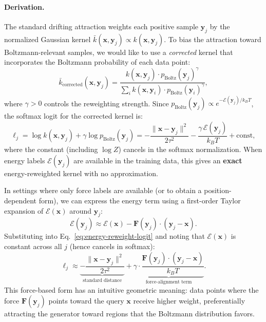 \documentclass[11pt]{article}
\newcommand{\bx}{\mathbf{x}}
\newcommand{\by}{\mathbf{y}}
\newcommand{\bF}{\mathbf{F}}
\newcommand{\kbar}{\bar{k}}
\newcommand{\pboltz}{p_{\text{Boltz}}}
\newcommand{\kBT}{k_BT}
\begin{document}
\paragraph{Derivation.}
The standard drifting attraction weights each positive sample $\by_j$ by the normalized Gaussian kernel $\kbar(\bx, \by_j) \propto k(\bx, \by_j)$.
To bias the attraction toward Boltzmann-relevant samples, we would like to use a \emph{corrected} kernel that incorporates the Boltzmann probability of each data point:
\begin{equation}
    \kbar_{\text{corrected}}(\bx, \by_j) = \frac{k(\bx,\by_j) \cdot \pboltz(\by_j)^\gamma}{\sum_i k(\bx,\by_i) \cdot \pboltz(\by_i)^\gamma},
    \label{eq:ideal-reweight}
\end{equation}
where $\gamma > 0$ controls the reweighting strength.
Since $\pboltz(\by_j) \propto e^{-\mathcal{E}(\by_j)/\kBT}$, the softmax logit for the corrected kernel is:
\begin{equation}
    \ell_j = \log k(\bx,\by_j) + \gamma\log\pboltz(\by_j) = -\frac{\|\bx - \by_j\|^2}{2\tau^2} - \frac{\gamma\,\mathcal{E}(\by_j)}{\kBT} + \text{const},
    \label{eq:energy-reweight-logit}
\end{equation}
where the constant (including $\log Z$) cancels in the softmax normalization.
When energy labels $\mathcal{E}(\by_j)$ are available in the training data, this gives an \textbf{exact} energy-reweighted kernel with no approximation.

In settings where only force labels are available (or to obtain a position-dependent form), we can express the energy term using a first-order Taylor expansion of $\mathcal{E}(\bx)$ around $\by_j$:
\begin{equation}
    \mathcal{E}(\by_j) \approx \mathcal{E}(\bx) - \bF(\by_j)\cdot(\by_j - \bx).
    \label{eq:taylor-energy}
\end{equation}
Substituting into Eq.~\eqref{eq:energy-reweight-logit} and noting that $\mathcal{E}(\bx)$ is constant across all $j$ (hence cancels in softmax):
\begin{equation}
    \ell_j \approx \underbrace{-\frac{\|\bx - \by_j\|^2}{2\tau^2}}_{\text{standard distance}} + \underbrace{\gamma \cdot \frac{\bF(\by_j) \cdot (\by_j - \bx)}{\kBT}}_{\text{force-alignment term}}.
    \label{eq:force-kernel-logits}
\end{equation}
This force-based form has an intuitive geometric meaning: data points where the force $\bF(\by_j)$ points toward the query $\bx$ receive higher weight, preferentially attracting the generator toward regions that the Boltzmann distribution favors.
\end{document}
